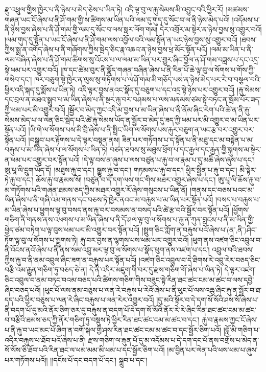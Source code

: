 རྫུ་འཕྲུལ་གྱིས་ཁྱེར་པ་ནི་ཉེས་པ་མེད་ཅེས་པ་ཡིན་ཏེ། འདི་ལྟ་བུ་ལ་རྐུ་སེམས་མི་འབྱུང་བའི་ཕྱིར་རོ། །མཚམས་གཞན་ཡང་ངོ་ཞེས་པ་ནི་ཤོ་གམ་གྱི་ས་ཚིགས་མ་ཡིན་པའི་ལམ་དུ་གུད་དུ་སོང་བ་ལ་ནི་ཉེས་མེད་པའོ། །འདོམས་པ་ནི་ཉེས་བྱས་ཞེས་པ་ནི་ཤོ་གམ་གྱི་ལམ་དུ་སོང་བ་ལས་སླར་ལོག་གམ། དེར་འགྲོར་མ་སྟེར་ན་ཉེས་བྱས་སུ་འགྱུར་བའོ། །ལམ་གུད་དུ་སྟོན་པ་ཡང་ངོ་ཞེས་པ་ནི་ཤོ་གམ་ལས་འབྱོལ་བའི་ལམ་སྟོན་ན་ཡང་ཉེས་བྱས་སུ་འགྱུར་བའོ། །ཐབས་ཀྱིས་སྨྲ་ན་འགོད་ཞེས་པ་ནི་གཞོགས་ཀྱིས་སྦེད་ཅིང་རྣ་འཆའ་ན་ཉེས་བྱས་ཕྲ་མོར་སྟོན་པའོ། །ལམ་མ་ཡིན་པ་ནི་ལམ་བཞིན་ཞེས་པ་ནི་ཤོ་གམ་ཚིགས་སུ་འོངས་པ་ལ་ལམ་མ་ཡིན་པར་གྱུར་ཞིང་བྱོལ་ན་ཤོ་གམ་བཟླས་པ་དང་འདྲ་སྟེ་ཕམ་པར་འགྱུར་བའོ། །ཁ་དང་ཚེམ་བུར་ནི་སྣོད་གཞན་བཞིན་ཞེས་པ་ནི་རིན་པོ་ཆེ་ལྟ་བུ་ལ་སོགས་པ་གོས་ཀྱི་གསེབ་དང་། ཁར་བཅུག་སྟེ་ཁྱེར་ན་ལུས་སུ་གཏོགས་པ་ལ་ཤོ་གམ་མི་གཅོད་པས་ན་ཉེས་མེད་པར་རེ་བ་བསྩལ་བའི་ཕྱིར་འདི་སྐད་དུ་སྨོས་པ་ཡིན་ཏེ། འདི་ལྟར་བྱས་ནའང་སྣོད་དུ་བཅུག་པ་དང་འདྲ་སྟེ་ཉེས་པར་འགྱུར་བའོ། །རྐུ་སེམས་དང་བྲལ་ན་མཐའ་སྒྲུབ་པ་མ་ཡིན་ཞེས་པ་ནི་སྔར་རྐུ་བར་བཤམས་པ་ལས་མནམས་ཙམ་སྟེ་བཏང་ན་སྦོམ་པོར་ཟད་ཀྱི་ཕམ་པར་མི་འགྱུར་བའོ། །སྦྱོར་བ་མེད་ཀྱང་འདི་མ་བྱས་པ་མ་ཡིན་ཞེས་པ་ནི་ནོམ་ཞིང་རེག་པའི་ཚེ་ན་ནི་རྐུ་སེམས་མེད་པ་ལ་ལེན་ཅིང་སྦེད་པའི་ཚེ་རྐུ་སེམས་ཡོད་ན་སྦྱོར་བ་མེད་དུ་ཟད་ཀྱི་ཕམ་པར་མི་འགྱུར་བ་མ་ཡིན་པར་སྟོན་པའོ། །ཡི་གེ་ལ་སོགས་པས་མི་བྲི་ཞེས་པ་ནི་སྤྲིང་ཡིག་ལ་སོགས་པས་རྐུར་བཅུག་ན་ཡང་རྩ་བར་འགྱུར་བར་སྟོན་པའོ། །བསྒྲུབ་པར་རྟོགས་པ་དེ་ལྟར་བསྟན་ནས། ཟིན་པར་གཏོགས་པ་ད་སྟོན་པ་ནི་མཐུ་དང་མ་བསྟེན་པ་མ་བརྐུས་པ་མ་ཡིན་ཞེས་པ་ལ་སོགས་པ་ཡིན་ཏེ། བཙན་ཐབས་སུ་མཐུས་ཕྲོག་པ་དང་རྒྱལ་དང་རྒྱན་གྱི་སྐུགས་མ་སྟེར་ན་ཕམ་པར་འགྱུར་བར་སྟོན་པའོ། །དེ་ལྟ་བས་ན་ཞུས་པ་ལས་བཙུན་པ་རྐུ་བ་ལ་རྣམ་པ་དུ་མཆི་ཞེས་ཞུས་པ་དང་། ཨུ་པཱ་ལི་དྲུག་ཡོད་དོ། །མཐུས་རྐུ་བ་དང་། སྒྱུས་རྐུ་བ་དང་། གཏམས་པ་རྐུ་བ་དང་། ཕྱིར་སྦྱིན་པ་རྐུ་བ་དང་། མི་སྟེར་ཏེ་རྐུ་བ་དང་། ཆོས་རྐུ་བ་རྣམས་སོ། །བཙུན་བ་དེ་དག་ལས་གང་གིས་མཐར་འགྱུར་ཞེས་པ་དང་། ཨུ་པཱ་ལི་ཆོས་རྐུ་བ་མ་གཏོགས་པའི་གཞན་ཐམས་ཅད་ཀྱིས་མཐར་འགྱུར་རོ་ཞེས་གསུངས་པ་ཡིན་ནོ། །གནས་དང་བཅས་པའང་མ་ཡིན་ཞེས་པ་ནི་གཞི་འམ་གནས་དང་བཅས་ཏེ་ཁྱེར་ནའང་མ་བརྐུས་པ་མ་ཡིན་པར་སྟོན་པའོ། །བསད་པ་བརྐུས་པ་མ་ཡིན་ཞེས་པ་ཕྱུགས་ལྟ་བུ་བསད་ནས་རྐུ་བར་བསམས་ན་བསད་པའི་ཚེ་རྩ་བའི་སྦྱོར་བར་སྟོན་པའོ། །ཕྱོགས་གཅིག་ནི་གནས་ནས་འཕགས་པ་མ་ཡིན་ཞེས་པ་ནི་དོ་ཤལ་ལྟ་བུ་ལ་སོགས་པ་རྐུ་ན་ཀུན་བླངས་པ་ནི་མ་ཡིན་གྱི་ཕྱེད་ཙམ་བཏེག་པ་ལྟ་བུས་ཕམ་པར་མི་འགྱུར་བར་སྟོན་པའོ། །སྤྲུག་ཅིང་ཀློག་ན་བརྐུས་པའོ་ཞེས་པ་(ན་‚ནི་)ཤིང་ཏོག་ལྟ་བུ་ལ་སོགས་པ་སྤྲུགས་ཏེ། རྐུ་བར་བྱས་ན་ལྷགས་པས་ཕམ་པར་འགྱུར་བའོ། །ཕུག་ནས་འཛག་ཅིང་འབྲུལ་བ་ནི་འོངས་ནའོ་ཞེས་པ་ནི་ནས་སམ་འབྲུ་མར་ལྟ་བུ་ལ་སོགས་པ་སྣོད་ཕུག་ནས་འཛག་པ་དང་། འབྲུལ་བའི་ཐབས་ཀྱིས་རྐུ་བ་ནི་ནམ་འབྲུལ་ཞིང་ཟག་ན་བརྐུས་པར་སྟོན་པའོ། །འཛག་ཅིང་འབྲུལ་བ་དེ་ཐིགས་རེ་འབྲུ་རེར་བཅད་ཅིང་བརྩི་འམ་རྒྱུན་གཅིག་ཏུ་བཅད་ཅེ་ན། དེ་ནི་འདིར་མཇུག་གི་བར་དུ་རྫས་གཅིག་གོ་ཞེས་པ་ཡིན་ཏེ། དེ་ལྟར་འཛག་ཅིང་འབྲུལ་བ་ནམ་བཏང་བའམ་བཅད་པའི་ཚིགས་གཅིག་གིས་བཟུང་སྟེ་རིན་ཐང་ཚང་ངམ་མ་ཚང་བ་ལས་དབྱེ་ཞིང་བཅད་པའོ། །ཕུང་པོ་ལས་ནམ་བཅུས་པ་ལན་རེ་བརྐུས་པ་རེའོ་ཞེས་པ་ནི་ཕུང་པོ་ལས་འཆུ་ཞིང་རྐུ་ན་སྦྱོར་བ་ཐ་དད་པའི་ཕྱིར་བཅུས་པ་ལན་རེ་ཞིང་བརྐུས་པ་ལན་རེར་འགྱུར་བའོ། །དུ་མའི་སྟོར་བ་དེ་དག་སོ་སོའི་ཤས་སོ་ཞེས་པ་ནི་བདག་པོ་དུ་མའི་ནོར་ཅིག་ཅར་དུ་བརྐུས་ན་བདག་པོ་དེ་དག་སོ་སོའི་ནོར་རེ་རེ་ཞིང་རིན་ཐང་ཚང་ངམ་མ་ཚང་བ་བརྩིའི་ཐམས་ཅད་ཀྱི་ནོར་གཅིག་ཏུ་བསྡུས་ཏེ་ཕྱིར་རིན་ཐང་ཚང་ངམ་མ་ཚང་བ་དང་། རྐུ་བ་རྣམས་ཀྱང་ངོ་ཞེས་པ་ནི་རྐུ་བ་ཡང་མང་པོ་ཞིག་ན་བགོ་སྐལ་གྱི་ཤས་རིན་ཐང་ཚང་ངམ་མ་ཚང་བ་དང་སྦྱོར་ཅིག་པའོ། །བློ་མི་གཅིག་པ་འདིར་བརྐུས་པ་ཐོབ་པའོ་ཞེས་པ་ནི། རྫས་གཅིག་ལ་རྐུན་པོ་དུ་མ་འདོམས་པ་དེ་དག་དང་པོ་ནས་བགྲོས་པ་མེད་ན་སོ་སོས་ཅི་ཐོབ་པའི་རིན་ཐང་ལ་ཕམ་མམ་མི་ཕམ་པ་དང་སྦྱོར་ཅིག་པའོ། །མ་བྱིན་པར་ལེན་པའི་ཕས་ཕམ་པ་ཞུས་པར་གཏོགས་པའོ།། །།དངོས་པོ་དང་བདག་པོ་དང་། སྒྲུབ་པ་དང་། 